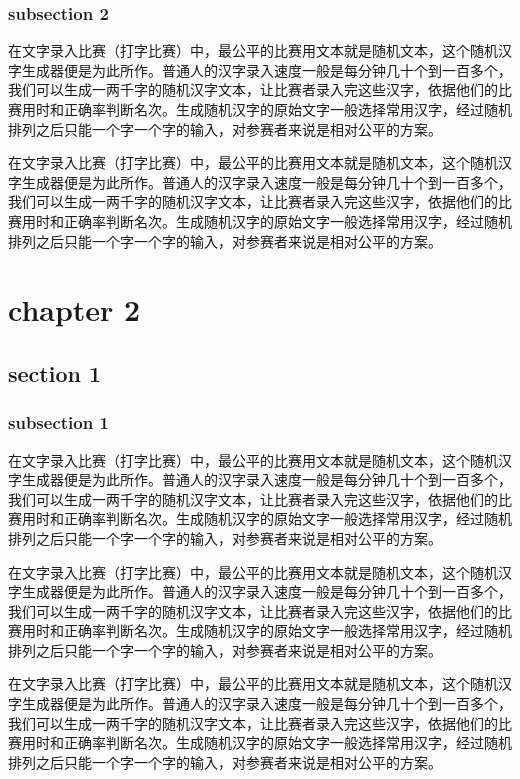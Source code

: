 \documentclass[12pt,hyperref,UTF8]{ctexbook}
\begin{document}
\subsection{subsection 2}

在文字录入比赛（打字比赛）中，最公平的比赛用文本就是随机文本，这个随机汉字生成器便是为此所作。普通人的汉字录入速度一般是每分钟几十个到一百多个，我们可以生成一两千字的随机汉字文本，让比赛者录入完这些汉字，依据他们的比赛用时和正确率判断名次。生成随机汉字的原始文字一般选择常用汉字，经过随机排列之后只能一个字一个字的输入，对参赛者来说是相对公平的方案。

在文字录入比赛（打字比赛）中，最公平的比赛用文本就是随机文本，这个随机汉字生成器便是为此所作。普通人的汉字录入速度一般是每分钟几十个到一百多个，我们可以生成一两千字的随机汉字文本，让比赛者录入完这些汉字，依据他们的比赛用时和正确率判断名次。生成随机汉字的原始文字一般选择常用汉字，经过随机排列之后只能一个字一个字的输入，对参赛者来说是相对公平的方案。


\cleardoublepage
\chapter{chapter 2}

\section{section 1}

\subsection{subsection 1}

在文字录入比赛（打字比赛）中，最公平的比赛用文本就是随机文本，这个随机汉字生成器便是为此所作。普通人的汉字录入速度一般是每分钟几十个到一百多个，我们可以生成一两千字的随机汉字文本，让比赛者录入完这些汉字，依据他们的比赛用时和正确率判断名次。生成随机汉字的原始文字一般选择常用汉字，经过随机排列之后只能一个字一个字的输入，对参赛者来说是相对公平的方案。

在文字录入比赛（打字比赛）中，最公平的比赛用文本就是随机文本，这个随机汉字生成器便是为此所作。普通人的汉字录入速度一般是每分钟几十个到一百多个，我们可以生成一两千字的随机汉字文本，让比赛者录入完这些汉字，依据他们的比赛用时和正确率判断名次。生成随机汉字的原始文字一般选择常用汉字，经过随机排列之后只能一个字一个字的输入，对参赛者来说是相对公平的方案。

在文字录入比赛（打字比赛）中，最公平的比赛用文本就是随机文本，这个随机汉字生成器便是为此所作。普通人的汉字录入速度一般是每分钟几十个到一百多个，我们可以生成一两千字的随机汉字文本，让比赛者录入完这些汉字，依据他们的比赛用时和正确率判断名次。生成随机汉字的原始文字一般选择常用汉字，经过随机排列之后只能一个字一个字的输入，对参赛者来说是相对公平的方案。
\end{document}
